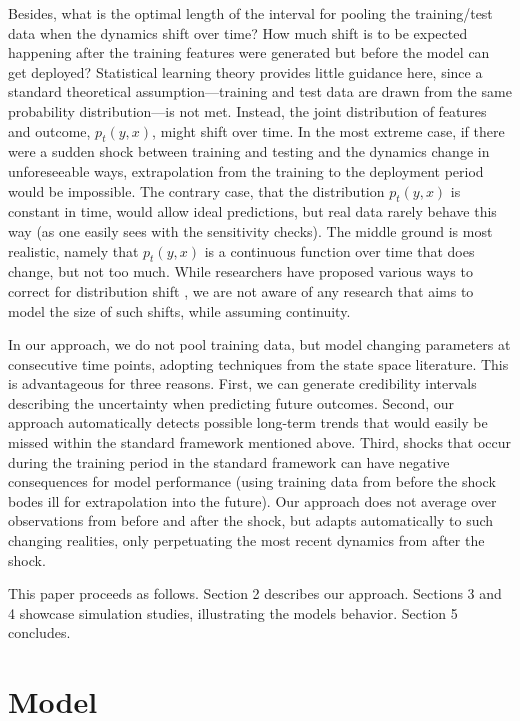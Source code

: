 \documentclass{article}
\begin{document}
Besides, what is the optimal length of the interval for pooling the training/test data when the dynamics shift over time? How much shift is to be expected happening after the training features were generated but before the model can get deployed? Statistical learning theory provides little guidance here, since a standard theoretical assumption---training and test data are drawn from the same probability distribution---is not met. Instead, the joint distribution of features and outcome, $p_t(y, x)$, might shift over time. In the most extreme case, if there were a sudden shock between training and testing and the dynamics change in unforeseeable ways, extrapolation from the training to the deployment period would be impossible. The contrary case, that the distribution $p_t(y, x)$ is constant in time, would allow ideal predictions, but real data rarely behave this way (as one easily sees with the sensitivity checks). The middle ground is most realistic, namely that $p_t(y, x)$ is a continuous function over time that does change, but not too much. While researchers have proposed various ways to correct for distribution shift \citep[e.g.,][p. 133ff.]{kim_universal_2022, varshney_trustworthy_2021}, we are not aware of any research that aims to model the size of such shifts, while assuming continuity.

In our approach, we do not pool training data, but model changing parameters at consecutive time points, adopting techniques from the state space literature. This is advantageous for three reasons. First, we can generate credibility intervals describing the uncertainty when predicting future outcomes. Second, our approach automatically detects possible long-term trends that would easily be missed within the standard framework mentioned above. Third, shocks that occur during the training period in the standard framework can have negative consequences for model performance (using training data from before the shock bodes ill for extrapolation into the future). Our approach does not average over observations from before and after the shock, but adapts automatically to such changing realities, only perpetuating the most recent dynamics from after the shock.

This paper proceeds as follows. Section 2 describes our approach. Sections 3 and 4 showcase simulation studies, illustrating the models behavior. Section 5 concludes.

\section{Model}\label{sec:model}
\end{document}
